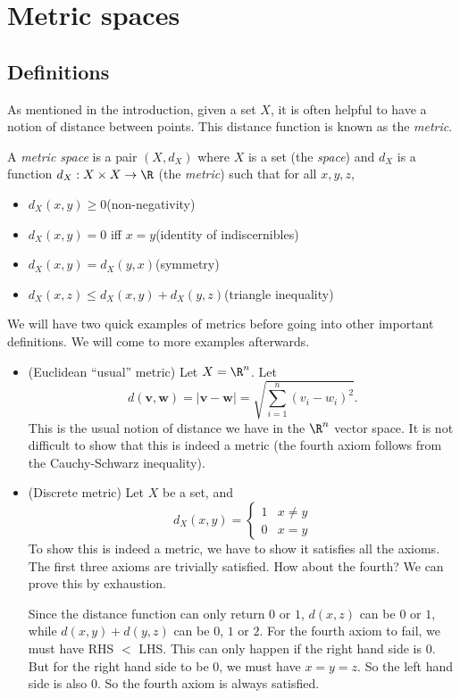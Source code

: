\documentclass[a4paper]{article}
\begin{document}
\section{Metric spaces}
\subsection{Definitions}
As mentioned in the introduction, given a set $X$, it is often helpful to have a notion of distance between points. This distance function is known as the \emph{metric}.
\begin{defi}
  A \emph{metric space} is a pair $(X, d_X)$ where $X$ is a set (the \emph{space}) and $d_X$ is a function $d_X: X \times X \to \R$ (the \emph{metric}) such that for all $x, y, z$,
  \begin{itemize}
    \item $d_X(x, y) \geq 0$\hfill(non-negativity)
    \item $d_X(x, y) = 0$ iff $x = y$\hfill(identity of indiscernibles)
    \item $d_X(x, y) = d_X(y, x)$\hfill(symmetry)
    \item $d_X(x, z) \leq d_X(x, y) + d_X(y, z)$\hfill(triangle inequality)
  \end{itemize}
\end{defi}

We will have two quick examples of metrics before going into other important definitions. We will come to more examples afterwards.
\begin{eg}\leavevmode
  \begin{itemize}
    \item (Euclidean ``usual'' metric) Let $X = \R^n$. Let
      \[
        d(\mathbf{v}, \mathbf{w}) = |\mathbf{v} - \mathbf{w}| = \sqrt{\sum_{i = 1}^n (v_i - w_i)^2}.
      \]
      This is the usual notion of distance we have in the $\R^n$ vector space. It is not difficult to show that this is indeed a metric (the fourth axiom follows from the Cauchy-Schwarz inequality).
    \item (Discrete metric) Let $X$ be a set, and
      \[
        d_X(x, y) =
        \begin{cases}
          1 & x \not= y\\
          0 & x = y
        \end{cases}
      \]
      To show this is indeed a metric, we have to show it satisfies all the axioms. The first three axioms are trivially satisfied. How about the fourth? We can prove this by exhaustion.
      
      Since the distance function can only return $0$ or $1$, $d(x, z)$ can be $0$ or $1$, while $d(x, y) + d(y, z)$ can be $0$, $1$ or $2$. For the fourth axiom to fail, we must have RHS $<$ LHS. This can only happen if the right hand side is $0$. But for the right hand side to be $0$, we must have $x = y = z$. So the left hand side is also $0$. So the fourth axiom is always satisfied.
  \end{itemize}
\end{eg}
\end{document}
